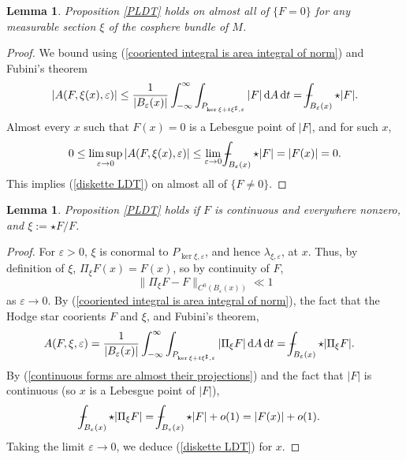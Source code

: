 \documentclass[reqno,11pt]{amsart}
\newcommand*\dif{\mathop{}\!\mathrm{d}}
\newtheorem{lemma}[theorem]{Lemma}
\theoremstyle{definition}
\numberwithin{equation}{section}
\def\Xint#1{\mathchoice
{\XXint\displaystyle\textstyle{#1}}%
{\XXint\textstyle\scriptstyle{#1}}%
{\XXint\scriptstyle\scriptscriptstyle{#1}}%
{\XXint\scriptscriptstyle\scriptscriptstyle{#1}}%
\!\int}
\def\XXint#1#2#3{{\setbox0=\hbox{$#1{#2#3}{\int}$ }
\vcenter{\hbox{$#2#3$ }}\kern-.6\wd0}}
\def\dashint{\Xint-}
\begin{document}
\begin{lemma}\label{PLDT nonzero}
Proposition \ref{PLDT} holds on almost all of $\{F = 0\}$ for any measurable section $\xi$ of the cosphere bundle of $M$.
\end{lemma}
\begin{proof}
We bound using (\ref{cooriented integral is area integral of norm}) and Fubini's theorem
$$|A(F, \xi(x), \varepsilon)| \leq \frac{1}{|B_\varepsilon(x)|} \int_{-\infty}^\infty \int_{P_{\ker \xi + t\xi^\sharp, \varepsilon}} |F| \dif A \dif t = \dashint_{B_\varepsilon(x)} \star |F|.$$
Almost every $x$ such that $F(x) = 0$ is a Lebesgue point of $|F|$, and for such $x$,
$$0 \leq \limsup_{\varepsilon \to 0} |A(F, \xi(x), \varepsilon)| \leq \lim_{\varepsilon \to 0} \dashint_{B_\varepsilon(x)} \star |F| = |F(x)| = 0.$$
This implies (\ref{diskette LDT}) on almost all of $\{F \neq 0\}$.
\end{proof}

\begin{lemma}\label{PLDT continuous}
Proposition \ref{PLDT} holds if $F$ is continuous and everywhere nonzero, and $\xi := \star F/F$.
\end{lemma}
\begin{proof}
For $\varepsilon > 0$, $\xi$ is conormal to $P_{\ker \xi, \varepsilon}$, and hence $\lambda_{\xi, \varepsilon}$, at $x$.
Thus, by definition of $\xi$, $\Pi_\xi F(x) = F(x)$, so by continuity of $F$,
\begin{equation}\label{continuous forms are almost their projections}
	\|\Pi_\xi F - F\|_{C^0(B_\varepsilon(x))} \ll 1
\end{equation}
as $\varepsilon \to 0$.
By (\ref{cooriented integral is area integral of norm}), the fact that the Hodge star coorients $F$ and $\xi$, and Fubini's theorem,
\begin{align*}
A(F, \xi, \varepsilon)
&= \frac{1}{|B_\varepsilon(x)|} \int_{-\infty}^\infty \int_{P_{\ker \xi + t\xi^\sharp, \varepsilon}} |\Pi_\xi F| \dif A \dif t
= \dashint_{B_\varepsilon(x)} \star |\Pi_\xi F|.
\end{align*}
By (\ref{continuous forms are almost their projections}) and the fact that $|F|$ is continuous (so $x$ is a Lebesgue point of $|F|$),
\begin{align*}
\dashint_{B_\varepsilon(x)} \star |\Pi_\xi F|
&= \dashint_{B_\varepsilon(x)} \star |F| + o(1) = |F(x)| + o(1).
\end{align*}
Taking the limit $\varepsilon \to 0$, we deduce (\ref{diskette LDT}) for $x$.
\end{proof}
\end{document}
